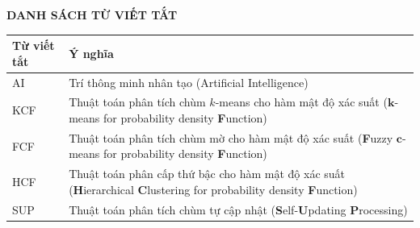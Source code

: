 \makeatletter
\begin{titlepage}
	
	\begin{center}
		{\fontsize{14}{0pt}\selectfont\bf DANH SÁCH TỪ VIẾT TẮT}
	\end{center}
	\vspace{50pt}
	
	
	\begin{table}[H]
		\centering
		\begin{tabular}{lp{11cm}} 
			\toprule
			\bf Từ viết tắt&\bf Ý nghĩa\\ \midrule
			AI & Trí thông minh nhân tạo (Artificial Intelligence)\\
			KCF & Thuật toán phân tích chùm $k$-means cho hàm mật độ xác suất ($\bm k$-means for probability density \textbf{F}unction)\\
			FCF & Thuật toán phân tích chùm mờ cho hàm mật độ xác suất (\textbf{F}uzzy $\bm c$-means for probability density \textbf{F}unction)\\
			HCF & Thuật toán phân cấp thứ bậc cho hàm mật độ xác suất (\textbf{H}ierarchical \textbf{C}lustering for probability density \textbf{F}unction)\\
			SUP & Thuật toán phân tích chùm tự cập nhật (\textbf{S}elf-\textbf{U}pdating \textbf{P}rocessing)\\
			\bottomrule
		\end{tabular}
	\end{table}
	
	
	
\end{titlepage}







































